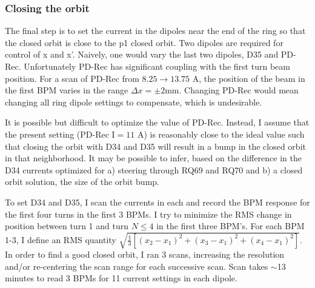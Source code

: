  


\subsubsection{Closing the orbit}

The final step is to set the current in the dipoles near the end of the ring so that the closed orbit is close to the p1 closed orbit.  Two dipoles are required for control of x and x'. Naively, one would vary the last two dipoles, D35 and PD-Rec. Unfortunately PD-Rec has significant coupling with the first turn beam position. For a scan of PD-Rec from $8.25 \rightarrow 13.75$ A, the position of the beam in the first BPM varies in the range $\Delta x = \pm 2$mm. Changing PD-Rec would mean changing all ring dipole settings to compensate, which is undesirable. 

It is possible but difficult to optimize the value of PD-Rec. Instead, I assume that the present setting (PD-Rec I$=11$ A) is reasonably close to the ideal value such that closing the orbit with D34 and D35 will result in a bump in the closed orbit in that neighborhood. It may be possible to infer, based on the difference in the D34 currents optimized for a) steering through RQ69 and RQ70 and b) a closed orbit solution, the size of the orbit bump. 

To set D34 and D35, I scan the currents in each and record the BPM response for the first four turns in the first 3 BPMs. I try to minimize the RMS change in position between turn 1 and turn $N\le4$ in the first three BPM's. For each BPM 1-3, I define an RMS quantity $\sqrt{\frac{1}{3}\left[ \left(x_2-x_1\right)^2+\left(x_3-x_1\right)^2+\left(x_4-x_1\right)^2\right]}$. In order to find a good closed orbit, I ran 3 scans, increasing the resolution and/or re-centering the scan range for each successive scan. Scan takes $\sim$13 minutes to read 3 BPMs for 11 current settings in each dipole. 

